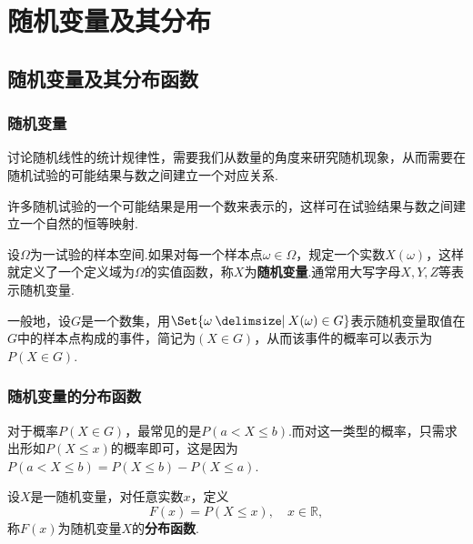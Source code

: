 \chapter{随机变量及其分布}
\section{随机变量及其分布函数}
\subsection{随机变量}
讨论随机线性的统计规律性，需要我们从数量的角度来研究随机现象，从而需要在随机试验的可能结果与数之间建立一个对应关系.

许多随机试验的一个可能结果是用一个数来表示的，这样可在试验结果与数之间建立一个自然的恒等映射.

\begin{definition}
设\(\Omega\)为一试验的样本空间.如果对每一个样本点\(\omega \in \Omega\)，规定一个实数\(X(\omega)\)，这样就定义了一个定义域为\(\Omega\)的实值函数，称\(X\)为\textbf{随机变量}.通常用大写字母\(X,Y,Z\)等表示随机变量.

一般地，设\(G\)是一个数集，用\(\Set{\omega \given X(\omega) \in G}\)表示随机变量取值在\(G\)中的样本点构成的事件，简记为\((X \in G)\)，从而该事件的概率可以表示为\(P(X \in G)\).
\end{definition}

\subsection{随机变量的分布函数}
对于概率\(P(X \in G)\)，最常见的是\(P(a < X \leqslant b)\).而对这一类型的概率，只需求出形如\(P(X \leqslant x)\)的概率即可，这是因为\(P(a < X \leqslant b) = P(X \leqslant b) - P(X \leqslant a)\).

\begin{definition}
设\(X\)是一随机变量，对任意实数\(x\)，定义\[
F(x) = P(X \leqslant x), \quad x \in \mathbb{R},
\]称\(F(x)\)为随机变量\(X\)的\textbf{分布函数}.
\end{definition}

